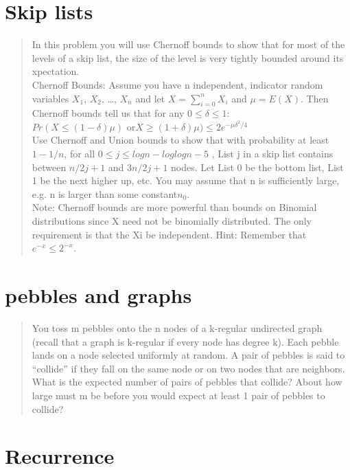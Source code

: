 \documentclass[titlepage]{article}\usepackage[]{graphicx}\usepackage[]{color}
\begin{document}
\section{ Skip lists }
\begin{quote}
	In this problem you will use Chernoff bounds to show that for most of the levels
	of a skip list, the size of the level is very tightly bounded around its
	xpectation. \\
	Chernoff Bounds: Assume you have n independent, indicator random variables
	$X_1$,
	$X_2$, \dots, $X_n$ and let $X = \sum_{i=0}^n X_i $ and $\mu = E(X)$. Then Chernoff bounds tell us
	that for any $0 \leq \delta \leq 1$: \\
	$ Pr(X \leq (1 − \delta)\mu) $ or$  X \geq (1 + \delta)\mu) \leq
	2e^{−\mu\delta^2 / 4} $ \\
	Use Chernoff and Union bounds to show that with probability at least
	$1−1/n$, for
	all $ 0 \leq j \leq log n − log log n-5$ , List j in a skip list contains
	between $n/2j+1$ 
	and $ 3n/2j+1$  nodes. Let List 0 be the bottom list, List 1 be the next higher up,
	etc. You may assume that n is sufficiently large, e.g. n is larger than some
	constant$n_0$. \\
	Note: Chernoff bounds are more powerful than bounds on Binomial distributions
	since X need not be binomially distributed. The only requirement is that the Xi
	be independent. Hint: Remember that $e^{−x} \leq 2^{−x}$.
\end{quote}





\section{pebbles and graphs}

\begin{quote}
	You toss m pebbles onto the n nodes of a k-regular undirected graph (recall
	that a graph is k-regular if every node has degree k). Each pebble lands on
	a node selected uniformly at random. A pair of pebbles is said to ``collide''
	if they fall on the same node or on two nodes that are neighbors. What is
	the expected number of pairs of pebbles that collide? About how large must
	m be before you would expect at least 1 pair of pebbles to collide?
\end{quote}

\section{Recurrence}
\end{document}
